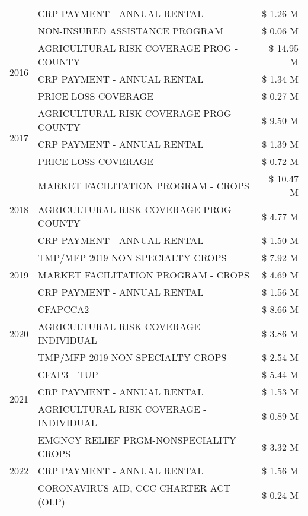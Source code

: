 \begin{tabular}{llr}
 & CRP PAYMENT - ANNUAL RENTAL & \$ 1.26 M \\
 & NON-INSURED ASSISTANCE PROGRAM & \$ 0.06 M \\
\cline{1-3}
\multirow[t]{3}{*}{2016} & AGRICULTURAL RISK COVERAGE PROG - COUNTY & \$ 14.95 M \\
 & CRP PAYMENT - ANNUAL RENTAL & \$ 1.34 M \\
 & PRICE LOSS COVERAGE & \$ 0.27 M \\
\cline{1-3}
\multirow[t]{3}{*}{2017} & AGRICULTURAL RISK COVERAGE PROG - COUNTY & \$ 9.50 M \\
 & CRP PAYMENT - ANNUAL RENTAL & \$ 1.39 M \\
 & PRICE LOSS COVERAGE & \$ 0.72 M \\
\cline{1-3}
\multirow[t]{3}{*}{2018} & MARKET FACILITATION PROGRAM - CROPS & \$ 10.47 M \\
 & AGRICULTURAL RISK COVERAGE PROG - COUNTY & \$ 4.77 M \\
 & CRP PAYMENT - ANNUAL RENTAL & \$ 1.50 M \\
\cline{1-3}
\multirow[t]{3}{*}{2019} & TMP/MFP 2019 NON SPECIALTY CROPS & \$ 7.92 M \\
 & MARKET FACILITATION PROGRAM - CROPS & \$ 4.69 M \\
 & CRP PAYMENT - ANNUAL RENTAL & \$ 1.56 M \\
\cline{1-3}
\multirow[t]{3}{*}{2020} & CFAPCCA2 & \$ 8.66 M \\
 & AGRICULTURAL RISK COVERAGE - INDIVIDUAL & \$ 3.86 M \\
 & TMP/MFP 2019 NON SPECIALTY CROPS & \$ 2.54 M \\
\cline{1-3}
\multirow[t]{3}{*}{2021} & CFAP3 - TUP & \$ 5.44 M \\
 & CRP PAYMENT - ANNUAL RENTAL & \$ 1.53 M \\
 & AGRICULTURAL RISK COVERAGE - INDIVIDUAL & \$ 0.89 M \\
\cline{1-3}
\multirow[t]{3}{*}{2022} & EMGNCY RELIEF PRGM-NONSPECIALITY CROPS & \$ 3.32 M \\
 & CRP PAYMENT - ANNUAL RENTAL & \$ 1.56 M \\
 & CORONAVIRUS AID, CCC CHARTER ACT (OLP) & \$ 0.24 M \\
\cline{1-3}
\bottomrule
\end{tabular}
